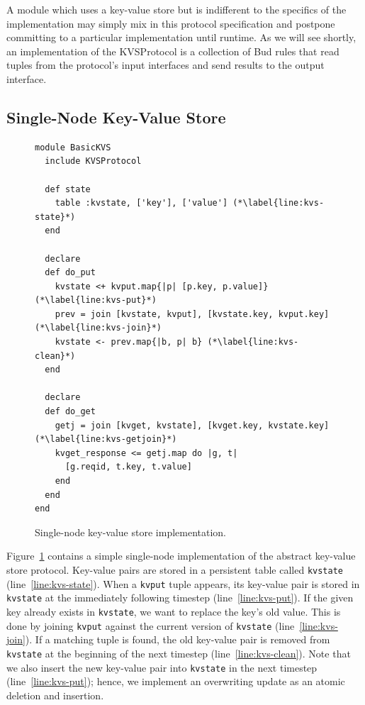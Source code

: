 A module which uses a key-value store but is indifferent to the specifics of the
implementation may simply mix in this protocol specification and postpone
committing to a particular implementation until runtime. As we will see shortly,
an implementation of the KVSProtocol is a collection of Bud rules that read
tuples from the protocol's input interfaces and send results to the output
interface.

\subsection{Single-Node Key-Value Store}
\label{sec:simple-kvs}
\begin{figure}[t]
\begin{scriptsize}
\begin{lstlisting}
module BasicKVS
  include KVSProtocol

  def state
    table :kvstate, ['key'], ['value'] (*\label{line:kvs-state}*)
  end

  declare
  def do_put
    kvstate <+ kvput.map{|p| [p.key, p.value]} (*\label{line:kvs-put}*) 
    prev = join [kvstate, kvput], [kvstate.key, kvput.key] (*\label{line:kvs-join}*)
    kvstate <- prev.map{|b, p| b} (*\label{line:kvs-clean}*)
  end

  declare
  def do_get
    getj = join [kvget, kvstate], [kvget.key, kvstate.key] (*\label{line:kvs-getjoin}*)
    kvget_response <= getj.map do |g, t|
      [g.reqid, t.key, t.value]
    end
  end
end
\end{lstlisting}
\centering
\vspace{-10pt}
\caption{Single-node key-value store implementation.}
\label{fig:kvs-impl}
\end{scriptsize}
\vspace{-2pt}
\end{figure}

Figure~\ref{fig:kvs-impl} contains a simple single-node implementation of the
abstract key-value store protocol. Key-value pairs are stored in a persistent
table called \texttt{kvstate} (line~\ref{line:kvs-state}). When a \texttt{kvput}
tuple appears, its key-value pair is stored in \texttt{kvstate} at the immediately
following timestep (line~\ref{line:kvs-put}).  If the given key already exists in
\texttt{kvstate}, we want to replace the key's old value. This is done by
joining \texttt{kvput} against the current version of \texttt{kvstate}
(line~\ref{line:kvs-join}). If a matching tuple is found, the old key-value pair
is removed from \texttt{kvstate} at the beginning of the next timestep
(line~\ref{line:kvs-clean}). Note that we also insert the new key-value pair
into \texttt{kvstate} in the next timestep (line~\ref{line:kvs-put});
hence, we implement an overwriting update as an atomic deletion and insertion.


